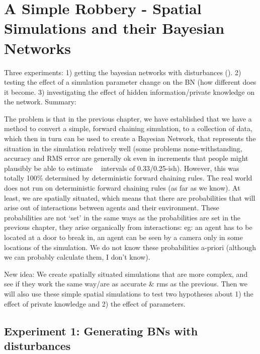  

\chapter[Simple Spatial Simulations]{A Simple Robbery - Spatial Simulations and their Bayesian Networks}

Three experiments: 1) getting the bayesian networks with disturbances (). 2) testing the effect of a simulation parameter change on the BN (how different does it become. 3) investigating the effect of hidden information/private knowledge on the network.
Summary:

 The problem is that in the previous chapter, we have established that we have a method to convert a simple, forward chaining simulation, to a collection of data, which then in turn can be used to create a Bayesian Network, that represents the situation in the simulation relatively well (some problems none-withstanding, accuracy and RMS error are generally ok even in increments that people might plausibly be able to estimate ~ intervals of 0.33/0.25-ish). However, this was totally 100\% determined by deterministic forward chaining rules. The real world does not run on deterministic forward chaining rules (as far as we know). At least, we are spatially situated, which means that there are probabilities that will arise out of interactions between agents and their environment. These probabilities are not `set' in the same ways as the probabilities are set in the previous chapter, they arise organically from interactions: eg: an agent has to be located at a door to break in, an agent can be seen by a camera only in some locations of the simulation. We do not know these probabilities a-priori (although we can probably calculate them, I don't know).
 
New idea: We create spatially situated simulations that are more complex, and see if they work the same way/are as accurate \& rms as the previous. Then we will also use these simple spatial simulations to test two hypotheses about 1) the effect of private knowledge and 2) the effect of parameters.


\section{Experiment 1: Generating BNs with disturbances}

